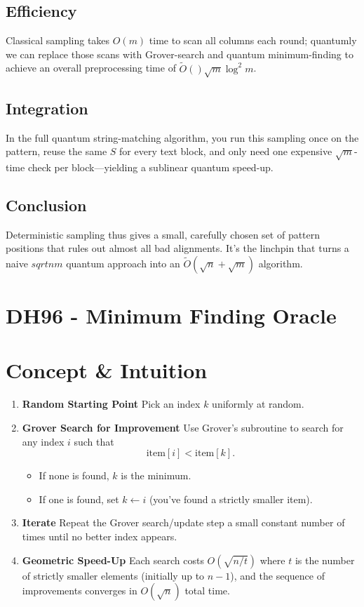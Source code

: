 \documentclass[11pt]{article}
\begin{document}
\subsection*{Efficiency}
Classical sampling takes \(O(m)\) time to scan all columns each round; quantumly we can replace those scans with Grover-search and quantum minimum-finding to achieve an overall preprocessing time of \(\widetilde{O}()\sqrt{m} \log^2 m\).

\subsection*{Integration}
In the full quantum string-matching algorithm, you run this sampling once on the pattern, reuse the same \(S\) for every text block, and only need one expensive \(\sqrt{m}\)-time check per block—yielding a sublinear quantum speed-up.

\subsection*{Conclusion}
Deterministic sampling thus gives a small, carefully chosen set of pattern positions that rules out almost all bad alignments. It's the linchpin that turns a naive \(sqrt{nm}\) quantum approach into an \(\widetilde{O}(\sqrt{n} + \sqrt{m})\) algorithm.

\section*{DH96 - Minimum Finding Oracle}
\section*{Concept \& Intuition}
\begin{enumerate}
  \item \textbf{Random Starting Point}
        Pick an index \(k\) uniformly at random.
  \item \textbf{Grover Search for Improvement}
        Use Grover's subroutine to search for any index \(i\) such that
        \[
          \text{item}[i] < \text{item}[k].
        \]
        \begin{itemize}
          \item If none is found, \(k\) is the minimum.
          \item If one is found, set \(k \leftarrow i\) (you've found a strictly smaller item).
        \end{itemize}
  \item \textbf{Iterate}
        Repeat the Grover search/update step a small constant number of times until no better index appears.
  \item \textbf{Geometric Speed-Up}
        Each search costs \(O(\sqrt{n/t})\) where \(t\) is the number of strictly smaller elements (initially up to \(n-1\)), and the sequence of improvements converges in \(O(\sqrt{n})\) total time.
\end{enumerate}
\end{document}

